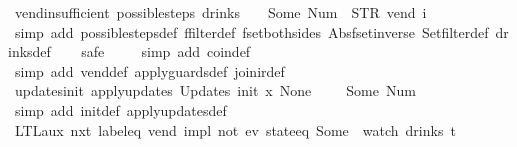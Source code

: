 \begin{isabellebody}
\ vend{\isacharunderscore}insufficient{\isacharcolon}\ {\isachardoublequoteopen}possible{\isacharunderscore}steps\ drinks\ {}\ {\isacharless}{}\ {\isachardollar}{\isacharcolon}{\isacharequal}\ Some\ {\isacharparenleft}Num\ {}{\isacharparenright}{\isachargreater}\ STR\ {\isacharprime}{\isacharprime}vend{\isacharprime}{\isacharprime}\ i\ {\isacharequal}\ {\isacharbraceleft}{\isacharbar}{\isacharbar}{\isacharbraceright}{\isachardoublequoteclose}\isanewline
%
\isadelimproof
\ \ %
\endisadelimproof
%
\isatagproof
{}\isamarkupfalse%
\ {\isacharparenleft}simp\ add{\isacharcolon}\ possible{\isacharunderscore}steps{\isacharunderscore}def\ ffilter{\isacharunderscore}def\ fset{\isacharunderscore}both{\isacharunderscore}sides\ Abs{\isacharunderscore}fset{\isacharunderscore}inverse\ Set{\isachardot}filter{\isacharunderscore}def\ drinks{\isacharunderscore}def{\isacharparenright}\isanewline
\ \ \isamarkupfalse%
\ safe\isanewline
\ \ \ \isamarkupfalse%
\ {\isacharparenleft}simp\ add{\isacharcolon}\ coin{\isacharunderscore}def{\isacharparenright}\isanewline
\ \ \isamarkupfalse%
\ {\isacharparenleft}simp\ add{\isacharcolon}\ vend{\isacharunderscore}def\ apply{\isacharunderscore}guards{\isacharunderscore}def\ join{\isacharunderscore}ir{\isacharunderscore}def{\isacharparenright}%
\endisatagproof
{\isafoldproof}%
%
\isadelimproof
\isanewline
%
\endisadelimproof
\isanewline
{}\isamarkupfalse%
\ updates{\isacharunderscore}init{\isacharcolon}\ {\isachardoublequoteopen}apply{\isacharunderscore}updates\ {\isacharparenleft}Updates\ init{\isacharparenright}\ {\isacharparenleft}{\isasymlambda}x{\isachardot}\ None{\isacharparenright}\ {\isacharless}{\isachargreater}\ {\isacharequal}\ {\isacharless}{}\ {\isachardollar}{\isacharcolon}{\isacharequal}\ Some\ {\isacharparenleft}Num\ {}{\isacharparenright}{\isachargreater}{\isachardoublequoteclose}\isanewline
%
\isadelimproof
\ \ %
\endisadelimproof
%
\isatagproof
{}\isamarkupfalse%
\ {\isacharparenleft}simp\ add{\isacharcolon}\ init{\isacharunderscore}def\ apply{\isacharunderscore}updates{\isacharunderscore}def{\isacharparenright}%
\endisatagproof
{\isafoldproof}%
%
\isadelimproof
\isanewline
%
\endisadelimproof
\isanewline
{}\isamarkupfalse%
\ LTL{\isacharunderscore}aux{}{\isacharcolon}\ {\isachardoublequoteopen}{\isacharparenleft}{\isacharparenleft}nxt\ {\isacharparenleft}label{\isacharunderscore}eq\ {\isacharprime}{\isacharprime}vend{\isacharprime}{\isacharprime}{\isacharparenright}{\isacharparenright}\ impl\ not\ {\isacharparenleft}ev\ {\isacharparenleft}state{\isacharunderscore}eq\ {\isacharparenleft}Some\ {}{\isacharparenright}{\isacharparenright}{\isacharparenright}{\isacharparenright}\ {\isacharparenleft}watch\ drinks\ t{\isacharparenright}{\isachardoublequoteclose}\isanewline

\end{isabellebody}
